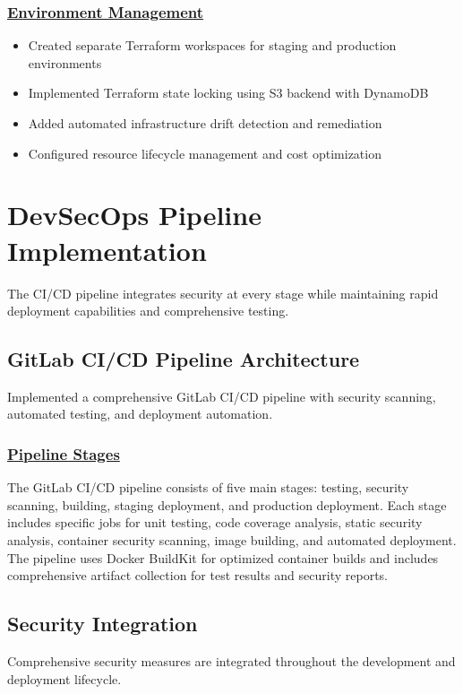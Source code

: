 \subsubsection*{\underline{Environment Management}}
\begin{itemize}
    \item Created separate Terraform workspaces for staging and production environments
    \item Implemented Terraform state locking using S3 backend with DynamoDB
    \item Added automated infrastructure drift detection and remediation
    \item Configured resource lifecycle management and cost optimization
\end{itemize}

\section{DevSecOps Pipeline Implementation}
The CI/CD pipeline integrates security at every stage while maintaining rapid deployment capabilities and comprehensive testing.

\subsection{GitLab CI/CD Pipeline Architecture}
Implemented a comprehensive GitLab CI/CD pipeline with security scanning, automated testing, and deployment automation.

\subsubsection*{\underline{Pipeline Stages}}
The GitLab CI/CD pipeline consists of five main stages: testing, security scanning, building, staging deployment, and production deployment. Each stage includes specific jobs for unit testing, code coverage analysis, static security analysis, container security scanning, image building, and automated deployment. The pipeline uses Docker BuildKit for optimized container builds and includes comprehensive artifact collection for test results and security reports.

\subsection{Security Integration}
Comprehensive security measures are integrated throughout the development and deployment lifecycle.

